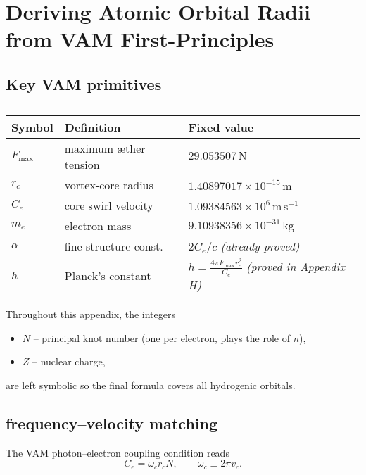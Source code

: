 

\section{Deriving Atomic Orbital Radii from VAM First-Principles}

\subsection{Key VAM primitives}

\begin{table}[h]
    \centering
    \begin{tabular}{lll}
        \toprule
        \textbf{Symbol} & \textbf{Definition} & \textbf{Fixed value} \\
        \midrule
        $F_{\max}$ & maximum æther tension & $29.053507\,\text{N}$ \\
        $r_c$ & vortex-core radius & $1.40897017\times10^{-15}\,\text{m}$ \\
        $C_e$ & core swirl velocity & $1.09384563\times10^{6}\,\text{m}\,\text{s}^{-1}$ \\
        $m_e$ & electron mass & $9.10938356\times10^{-31}\,\text{kg}$ \\
        $\alpha$ & fine-structure const. & $2C_e/c$ \textit{(already proved)} \\
        $h$ & Planck’s constant & $\displaystyle h=\frac{4\pi F_{\max}r_c^{2}}{C_e}$ \textit{(proved in Appendix H)} \\
        \bottomrule
    \end{tabular}
    \caption{}
    \label{tab:primitives}
\end{table}

Throughout this appendix, the integers
\begin{itemize}
    \item $N$ -- principal knot number (one per electron, plays the role of $n$),
    \item $Z$ -- nuclear charge,
\end{itemize}
are left symbolic so the final formula covers all hydrogenic orbitals.

\subsection{frequency--velocity matching}

The VAM photon--electron coupling condition reads
\begin{equation}
    C_e = \omega_c r_c N, \qquad \omega_c \equiv 2\pi v_c.
\label{eq:match1}
\end{equation}

